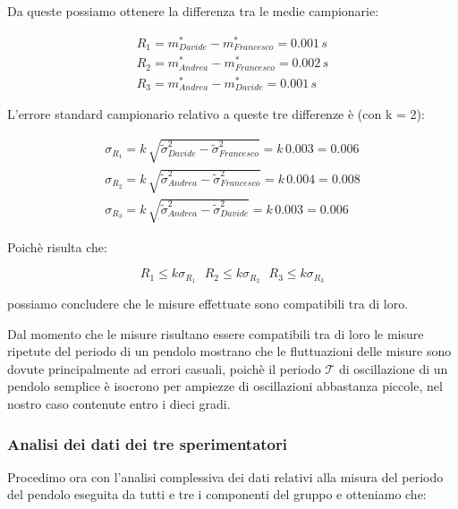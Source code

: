 Da queste possiamo ottenere la differenza tra le medie campionarie:

\begin{equation*}
	\begin{split}
		R_{1} = m_{Davide}^* - m_{Francesco}^* = 0.001\,s \\
		R_{2} = m_{Andrea}^* - m_{Francesco}^* = 0.002\,s \\
		R_{3} = m_{Andrea}^* - m_{Davide}^* = 0.001\,s
	\end{split}
\end{equation*}

L'errore standard campionario relativo a queste tre differenze è (con k = 2):

\begin{equation*}
	\begin{split}
		\sigma_{R_{1}} = k\,\sqrt{\tilde{\sigma}^2_{Davide} - \tilde{\sigma}^2_{Francesco}} = k\,0.003 = 0.006\\
		\sigma_{R_{2}} = k\,\sqrt{\tilde{\sigma}^2_{Andrea} - \tilde{\sigma}^2_{Francesco}} = k\,0.004 = 0.008\\
		\sigma_{R_{3}} = k\,\sqrt{\tilde{\sigma}^2_{Andrea} - \tilde{\sigma}^2_{Davide}} = k\,0.003 = 0.006
	\end{split}
\end{equation*}

Poichè risulta che:

\begin{equation*}
	R_{1}\leq{k\sigma_{R_{1}}}\,\,\,\,R_{2}\leq{k\sigma_{R_{2}}}\,\,\,\,R_{3}\leq{k\sigma_{R_{3}}}
\end{equation*}

possiamo concludere che le misure effettuate sono compatibili tra di loro.
 
Dal momento che le misure risultano essere compatibili tra di loro le misure
ripetute del periodo di un pendolo mostrano che le fluttuazioni delle misure
sono dovute principalmente ad errori casuali, poichè il periodo
$\mathcal{T}$ di oscillazione di un pendolo semplice è isocrono per ampiezze
di oscillazioni abbastanza piccole, nel nostro caso contenute entro i dieci gradi.

\subsubsection{Analisi dei dati dei tre sperimentatori}

Procedimo ora con l'analisi complessiva dei dati relativi alla misura del
periodo del pendolo eseguita da tutti e tre i componenti del gruppo e otteniamo che:

